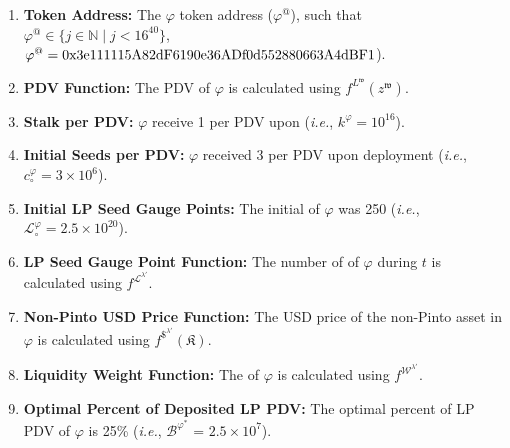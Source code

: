 \documentclass[class=article, crop=false]{standalone}
\begin{document}
\begin{enumerate}

    \item \textbf{Token Address:} The $\varphi$ token address ($\varphi^{@}$), such that $\varphi^{@} \in \{j \in \mathbb{N} \mid j < 16^{40} \}$, $\varphi^{@} = \\ \text{0x3e111115A82dF6190e36ADf0d552880663A4dBF1}$).
    
    \item \textbf{PDV Function:} The PDV of $\varphi$ is calculated using $f^{L^{\mathfrak{w}}}(z^{\mathfrak{w}})$.
                
    \item \textbf{Stalk per PDV:} $\varphi$  receive 1  per PDV upon  (\textit{i.e.}, $k^{\varphi} = 10^{16}$).
    
    \item \textbf{Initial Seeds per PDV:} $\varphi$  received 3  per PDV upon deployment (\textit{i.e.}, ${c_{\circ}^{\varphi}} = 3 \times 10^6$).

    \item \textbf{Initial LP Seed Gauge Points:} The initial  of $\varphi$ was 250 (\textit{i.e.}, $\mathscr{L}_{\circ}^{\varphi} = 2.5 \times 10^{20}$).
    
    \item \textbf{LP Seed Gauge Point Function:} The number of  of $\varphi$ during $t$ is calculated using $f^{\mathscr{L}^{\lambda'}}$.

    \item \textbf{Non-Pinto USD Price Function:} The USD price of the non-Pinto asset in $\varphi$ is calculated using $f^{\$^{\lambda'}}(\mathfrak{K})$.
    
    \item \textbf{Liquidity Weight Function:} The  of $\varphi$ is calculated using $f^{\mathscr{W}^{\lambda'}}$.
    
    \item \textbf{Optimal Percent of Deposited LP PDV:} The optimal percent of  LP PDV of $\varphi$ is 25\% (\textit{i.e.}, $\mathscr{B}^{\varphi^{*}}$ = $2.5 \times 10^{7}$).


\end{enumerate}
\end{document}
